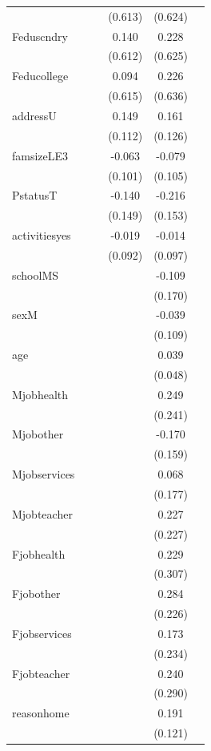 \documentclass[12pt,english]{article}
\begin{document}
\begin{longtable}[c]{lccccc}
 &  &  & (0.613) & (0.624) & \\
Feduscndry &  &  & 0.140 & 0.228 & \\
 &  &  & (0.612) & (0.625) & \\
Feducollege &  &  & 0.094 & 0.226 & \\
 &  &  & (0.615) & (0.636) & \\
addressU &  &  & 0.149 & 0.161 & \\
 &  &  & (0.112) & (0.126) & \\
famsizeLE3 &  &  & -0.063 & -0.079 & \\
 &  &  & (0.101) & (0.105) & \\
PstatusT &  &  & -0.140 & -0.216 & \\
 &  &  & (0.149) & (0.153) & \\
activitiesyes &  &  & -0.019 & -0.014 & \\
 &  &  & (0.092) & (0.097) & \\
schoolMS &  &  &  & -0.109 & \\
 &  &  &  & (0.170) & \\
sexM &  &  &  & -0.039 & \\
 &  &  &  & (0.109) & \\
age &  &  &  & 0.039 & \\
 &  &  &  & (0.048) & \\
Mjobhealth &  &  &  & 0.249 & \\
 &  &  &  & (0.241) & \\
Mjobother &  &  &  & -0.170 & \\
 &  &  &  & (0.159) & \\
Mjobservices &  &  &  & 0.068 & \\
 &  &  &  & (0.177) & \\
Mjobteacher &  &  &  & 0.227 & \\
 &  &  &  & (0.227) & \\
Fjobhealth &  &  &  & 0.229 & \\
 &  &  &  & (0.307) & \\
Fjobother &  &  &  & 0.284 & \\
 &  &  &  & (0.226) & \\
Fjobservices &  &  &  & 0.173 & \\
 &  &  &  & (0.234) & \\
Fjobteacher &  &  &  & 0.240 & \\
 &  &  &  & (0.290) & \\
reasonhome &  &  &  & 0.191 & \\
 &  &  &  & (0.121) & \\

\end{longtable}
\end{document}
